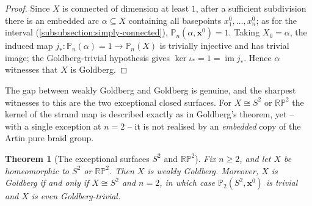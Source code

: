 \documentclass[reqno]{amsart}
\newtheorem{theorem}{Theorem}[section]
\theoremstyle{definition}
\newcommand\bfx{\mathbf{x}}
\newcommand{\PB}{\mathbb{P}}
\newcommand{\im}{\operatorname{im}}
\newcommand{\RP}{\mathbb{RP}}
\newcommand{\base}{\bfx^0}
\numberwithin{equation}{section}
\begin{document}
\begin{proof}
Since \(X\) is connected of dimension at least \(1\), after a
sufficient subdivision there is an embedded arc
\(\alpha\subseteq X\) containing all basepoints
\(x_1^0,\dots,x_n^0\); as for the interval
(\cref{subsubsection:simply-connected}),
\(\PB_n(\alpha,\base) = 1\). Taking \(X_0 = \alpha\), the induced map
\(j_\ast\colon\PB_n(\alpha) = 1\to\PB_n(X)\) is trivially injective
and has trivial image; the Goldberg-trivial hypothesis gives
\(\ker\iota_\ast = 1 = \im j_\ast\). Hence \(\alpha\) witnesses that
\(X\) is Goldberg.
\end{proof}

The gap between weakly Goldberg and Goldberg is genuine, and
the sharpest witnesses to this are the two exceptional closed
surfaces. For \(X\cong S^2\) or \(\RP^2\) the kernel of the
strand map is described exactly as in Goldberg's theorem, yet --
with a single exception at \(n=2\) -- it is not realised by an
\emph{embedded} copy of the Artin pure braid group.

\begin{theorem}[The exceptional surfaces \(S^2\) and \(\RP^2\)]
\label{thm:s2-rp2-exceptional}
Fix \(n\geq 2\), and let \(X\) be homeomorphic to \(S^2\) or
\(\RP^2\). Then \(X\) is weakly Goldberg. Moreover, \(X\) is
Goldberg if and only if \(X\cong S^2\) and \(n=2\), in which
case \(\PB_2(S^2,\base)\) is trivial and \(X\) is even
Goldberg-trivial.
\end{theorem}
\end{document}
